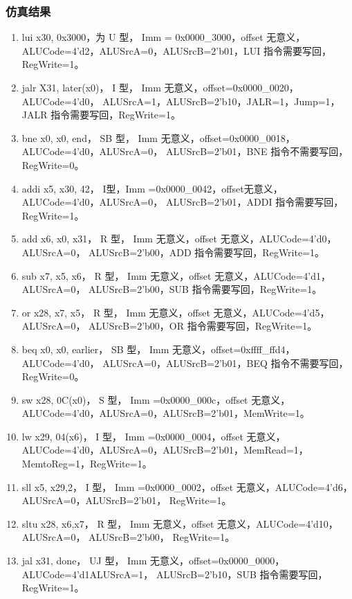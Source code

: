 \documentclass{../source/Experiment}
\begin{document}
            \subsubsection{仿真结果}
                \begin{enumerate}
                    \item lui x30, 0x3000，为 U 型， Imm = 0x0000\_3000，offset 无意义，ALUCode=4’d2，ALUSrcA=0，ALUSrcB=2’b01，LUI 指令需要写回，RegWrite=1。
                    \item jalr X31, later(x0)， I 型， Imm 无意义，offset=0x0000\_0020，ALUCode=4’d0，
                    ALUSrcA=1，ALUSrcB=2’b10，JALR=1，Jump=1，JALR 指令需要写回，RegWrite=1。
                    \item bne x0, x0, end， SB 型， Imm 无意义，offset=0x0000\_0018，ALUCode=4’d0，ALUSrcA=0，
                    ALUSrcB=2’b01，BNE 指令不需要写回，RegWrite=0。
                    \item addi x5, x30, 42， I型，Imm =0x0000\_0042，offset无意义，ALUCode=4’d0，ALUSrcA=0，
                    ALUSrcB=2’b01，ADDI 指令需要写回，RegWrite=1。
                    \item add x6, x0, x31， R 型， Imm 无意义，offset 无意义，ALUCode=4’d0，ALUSrcA=0，
                    ALUSrcB=2’b00，ADD 指令需要写回，RegWrite=1。
                    \item sub x7, x5, x6， R 型， Imm 无意义，offset 无意义，ALUCode=4’d1，ALUSrcA=0，
                    ALUSrcB=2’b00，SUB 指令需要写回，RegWrite=1。
                    \item or x28, x7, x5， R 型， Imm 无意义，offset 无意义，ALUCode=4’d5，ALUSrcA=0，
                    ALUSrcB=2’b00，OR 指令需要写回，RegWrite=1。
                    \item beq x0, x0, earlier， SB 型， Imm 无意义，offset=0xffff\_ffd4，ALUCode=4’d0，
                    ALUSrcA=0，ALUSrcB=2’b01，BEQ 指令不需要写回，RegWrite=0。
                    \item sw x28, 0C(x0)， S 型， Imm =0x0000\_000c，offset 无意义，ALUCode=4’d0，ALUSrcA=0，ALUSrcB=2’b01，MemWrite=1。
                    \item lw x29, 04(x6)， I 型， Imm =0x0000\_0004，offset 无意义，ALUCode=4’d0，ALUSrcA=0，ALUSrcB=2’b01，MemRead=1，MemtoReg=1，RegWrite=1。
                    \item sll x5, x29,2， I 型， Imm =0x0000\_0002，offset 无意义，ALUCode=4’d6，ALUSrcA=0，ALUSrcB=2’b01， RegWrite=1。
                    \item sltu x28, x6,x7， R 型， Imm 无意义，offset 无意义，ALUCode=4’d10，ALUSrcA=0，
                    ALUSrcB=2’b00， RegWrite=1。
                    \item jal x31, done， UJ 型， Imm 无意义，offset=0x0000\_0000，ALUCode=4’d1ALUSrcA=1，
                    ALUSrcB=2’b10，SUB 指令需要写回，RegWrite=1。
                \end{enumerate}
\end{document}
